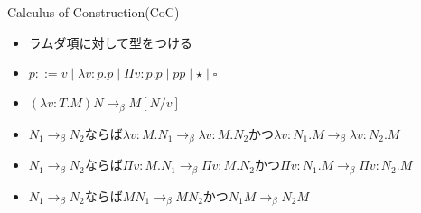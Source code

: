 \documentclass[18pt]{beamer}
\begin{document}
\begin{frame}{Calculus of Construction(CoC)}
 \begin{itemize}
  \item ラムダ項に対して型をつける
  \item $p ::= v \mid \lambda v \colon p. p \mid \Pi v \colon p. p \mid p p \mid \star \mid \square$
  \item $(\lambda v \colon T. M) N \rightarrow_\beta M[N/v]$
  \item $N_1 \rightarrow_\beta N_2$ならば$\lambda v \colon M. N_1 \rightarrow_\beta \lambda v \colon M. N_2$かつ$\lambda v \colon N_1. M \rightarrow_\beta \lambda v \colon N_2. M$
  \item $N_1 \rightarrow_\beta N_2$ならば$\Pi v \colon M. N_1 \rightarrow_\beta \Pi v \colon M. N_2$かつ$\Pi v \colon N_1. M \rightarrow_\beta \Pi v \colon N_2. M$
  \item $N_1 \rightarrow_\beta N_2$ならば$M N_1 \rightarrow_\beta M N_2$かつ$N_1 M \rightarrow_\beta N_2 M$
 \end{itemize}
\end{frame}
\end{document}
